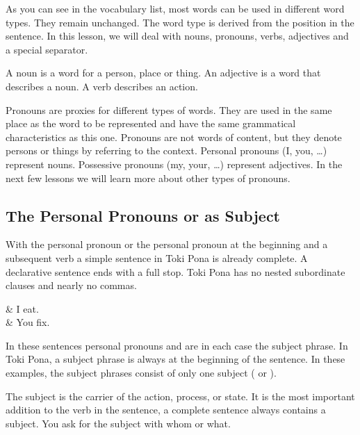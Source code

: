 As you can see in the vocabulary list, most words can be used in different word types.
They remain unchanged.
The word type is derived from the position in the sentence.
In this lesson, we will deal with nouns, pronouns, verbs, adjectives and a special separator.

A noun is a word for a person, place or thing.
An adjective is a word that describes a noun.
A verb describes an action.

Pronouns are proxies for different types of words.
They are used in the same place as the word to be represented and have the same grammatical characteristics as this one.
Pronouns are not words of content, but they denote persons or things by referring to the context.
Personal pronouns (I, you, \dots) represent nouns.
Possessive pronouns (my, your, \dots) represent adjectives.
In the next few lessons we will learn more about other types of pronouns.

\subsection*{The Personal Pronouns  or  as Subject}
With the personal pronoun  or the personal pronoun  at the beginning and a subsequent verb a simple sentence in Toki Pona is already complete.
A declarative sentence ends with a full stop.
Toki Pona has no nested subordinate clauses and nearly no commas.

\begin{translationtable}
       & I eat.   \\
     & You fix. \\
\end{translationtable}
%
In these sentences personal pronouns  and  are in each case the subject phrase.
In Toki Pona, a subject phrase is always at the beginning of the sentence.
In these examples, the subject phrases consist of only one subject ( or ).

The subject is the carrier of the action, process, or state.
It is the most important addition to the verb in the sentence, a complete sentence always contains a subject.
You ask for the subject with whom or what.

